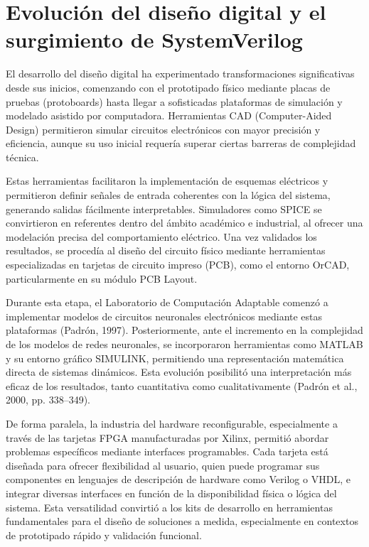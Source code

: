 \section{Evolución del diseño digital y el surgimiento de SystemVerilog}
El desarrollo del diseño digital ha experimentado transformaciones significativas desde sus inicios, comenzando con el prototipado físico mediante placas de pruebas (protoboards) hasta llegar a sofisticadas plataformas de simulación y modelado asistido por computadora. Herramientas CAD (Computer-Aided Design) permitieron simular circuitos electrónicos con mayor precisión y eficiencia, aunque su uso inicial requería superar ciertas barreras de complejidad técnica.

Estas herramientas facilitaron la implementación de esquemas eléctricos y permitieron definir señales de entrada coherentes con la lógica del sistema, generando salidas fácilmente interpretables. Simuladores como SPICE se convirtieron en referentes dentro del ámbito académico e industrial, al ofrecer una modelación precisa del comportamiento eléctrico. Una vez validados los resultados, se procedía al diseño del circuito físico mediante herramientas especializadas en tarjetas de circuito impreso (PCB), como el entorno OrCAD, particularmente en su módulo PCB Layout.

Durante esta etapa, el Laboratorio de Computación Adaptable comenzó a implementar modelos de circuitos neuronales electrónicos mediante estas plataformas (Padrón, 1997). Posteriormente, ante el incremento en la complejidad de los modelos de redes neuronales, se incorporaron herramientas como MATLAB y su entorno gráfico SIMULINK, permitiendo una representación matemática directa de sistemas dinámicos. Esta evolución posibilitó una interpretación más eficaz de los resultados, tanto cuantitativa como cualitativamente (Padrón et al., 2000, pp. 338–349).

De forma paralela, la industria del hardware reconfigurable, especialmente a través de las tarjetas FPGA manufacturadas por Xilinx, permitió abordar problemas específicos mediante interfaces programables. Cada tarjeta está diseñada para ofrecer flexibilidad al usuario, quien puede programar sus componentes en lenguajes de descripción de hardware como Verilog o VHDL, e integrar diversas interfaces en función de la disponibilidad física o lógica del sistema. Esta versatilidad convirtió a los kits de desarrollo en herramientas fundamentales para el diseño de soluciones a medida, especialmente en contextos de prototipado rápido y validación funcional.

